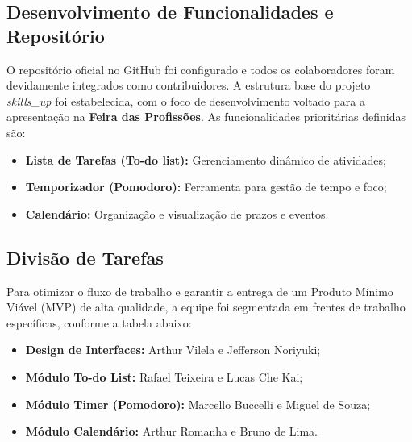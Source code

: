 \subsection{Desenvolvimento de Funcionalidades e Repositório}
O repositório oficial no GitHub foi configurado e todos os colaboradores foram devidamente integrados como contribuidores. A estrutura base do projeto \textit{skills\_up} foi estabelecida, com o foco de desenvolvimento voltado para a apresentação na \textbf{Feira das Profissões}. As funcionalidades prioritárias definidas são:
\begin{itemize}
    \item \textbf{Lista de Tarefas (To-do list):} Gerenciamento dinâmico de atividades;
    \item \textbf{Temporizador (Pomodoro):} Ferramenta para gestão de tempo e foco;
    \item \textbf{Calendário:} Organização e visualização de prazos e eventos.
\end{itemize}

\subsection{Divisão de Tarefas}
Para otimizar o fluxo de trabalho e garantir a entrega de um Produto Mínimo Viável (MVP) de alta qualidade, a equipe foi segmentada em frentes de trabalho específicas, conforme a tabela abaixo:

\begin{itemize}
    \item \textbf{Design de Interfaces:} Arthur Vilela e Jefferson Noriyuki;
    \item \textbf{Módulo To-do List:} Rafael Teixeira e Lucas Che Kai;
    \item \textbf{Módulo Timer (Pomodoro):} Marcello Buccelli e Miguel de Souza;
    \item \textbf{Módulo Calendário:} Arthur Romanha e Bruno de Lima.
\end{itemize}

